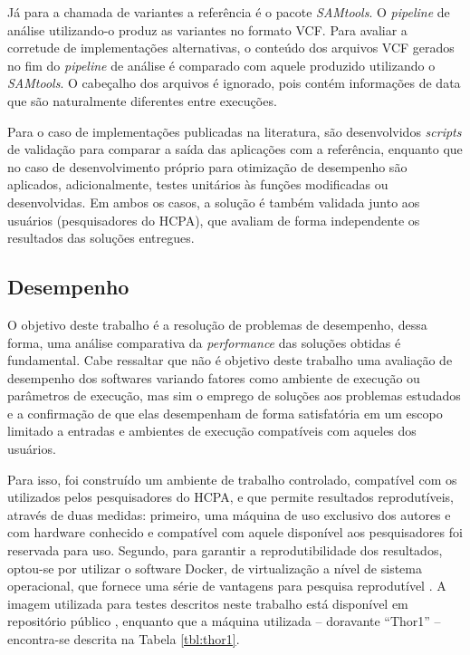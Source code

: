 \documentclass[cic,tc]{iiufrgs}
\begin{document}
Já para a chamada de variantes a referência é o pacote \textit{SAMtools}. O
\textit{pipeline} de análise utilizando-o produz as variantes no formato VCF.
Para avaliar a corretude de implementações alternativas, o conteúdo dos
arquivos VCF gerados no fim do \textit{pipeline} de análise é comparado com
aquele produzido utilizando o \textit{SAMtools}. O cabeçalho dos arquivos é
ignorado, pois contém informações de data que são naturalmente diferentes entre
execuções.

Para o caso de implementações publicadas na literatura, são desenvolvidos
\textit{scripts} de validação para comparar a saída das aplicações com a
referência, enquanto que no caso de desenvolvimento próprio para otimização de
desempenho são aplicados, adicionalmente, testes unitários às funções
modificadas ou desenvolvidas. Em ambos os casos, a solução é também validada
junto aos usuários (pesquisadores do HCPA), que avaliam de forma independente
os resultados das soluções entregues.

\subsection{Desempenho}
\label{sec:perfmethod}

O objetivo deste trabalho é a resolução de problemas de desempenho, dessa
forma, uma análise comparativa da \textit{performance} das soluções obtidas é
fundamental. Cabe ressaltar que não é objetivo deste trabalho uma avaliação de
desempenho dos softwares variando fatores como ambiente de execução ou
parâmetros de execução, mas sim o emprego de soluções aos problemas estudados e
a confirmação de que elas desempenham de forma satisfatória em um escopo
limitado a entradas e ambientes de execução compatíveis com aqueles dos
usuários.

Para isso, foi construído um ambiente de trabalho controlado, compatível com os
utilizados pelos pesquisadores do HCPA, e que permite resultados reprodutíveis,
através de duas medidas: primeiro, uma máquina de uso exclusivo dos autores e
com hardware conhecido e compatível com aquele disponível aos pesquisadores foi
reservada para uso. Segundo, para garantir a reprodutibilidade dos resultados,
optou-se por utilizar o software Docker, de virtualização a nível de sistema
operacional, que fornece uma série de vantagens para pesquisa reprodutível
\cite{boettiger2015introduction}. A imagem utilizada para testes descritos
neste trabalho está disponível em repositório público \cite{dockerme}, enquanto
que a máquina utilizada -- doravante ``Thor1'' -- encontra-se descrita na
Tabela \ref{tbl:thor1}.
\end{document}
